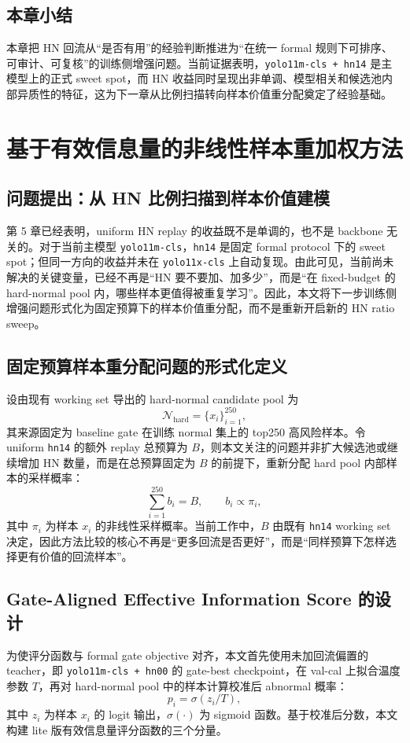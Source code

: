 \documentclass[UTF8,openany,12pt]{ctexbook}
\begin{document}
\section{本章小结}
本章把 HN 回流从“是否有用”的经验判断推进为“在统一 formal 规则下可排序、可审计、可复核”的训练侧增强问题。当前证据表明，\texttt{yolo11m-cls + hn14} 是主模型上的正式 sweet spot，而 HN 收益同时呈现出非单调、模型相关和候选池内部异质性的特征，这为下一章从比例扫描转向样本价值重分配奠定了经验基础。

\chapter{基于有效信息量的非线性样本重加权方法}

\section{问题提出：从 HN 比例扫描到样本价值建模}
第 5 章已经表明，uniform HN replay 的收益既不是单调的，也不是 backbone 无关的。对于当前主模型 \texttt{yolo11m-cls}，\texttt{hn14} 是固定 formal protocol 下的 sweet spot；但同一方向的收益并未在 \texttt{yolo11x-cls} 上自动复现。由此可见，当前尚未解决的关键变量，已经不再是“HN 要不要加、加多少”，而是“在 fixed-budget 的 hard-normal pool 内，哪些样本更值得被重复学习”。因此，本文将下一步训练侧增强问题形式化为固定预算下的样本价值重分配，而不是重新开启新的 HN ratio sweep。

\section{固定预算样本重分配问题的形式化定义}
设由现有 working set 导出的 hard-normal candidate pool 为
\begin{equation}
\mathcal{N}_{\mathrm{hard}} = \{x_i\}_{i=1}^{250},
\end{equation}
其来源固定为 baseline gate 在训练 normal 集上的 top250 高风险样本。令 uniform \texttt{hn14} 的额外 replay 总预算为 $B$，则本文关注的问题并非扩大候选池或继续增加 HN 数量，而是在总预算固定为 $B$ 的前提下，重新分配 hard pool 内部样本的采样概率：
\begin{equation}
\sum_{i=1}^{250} b_i = B,
\qquad
b_i \propto \pi_i,
\end{equation}
其中 $\pi_i$ 为样本 $x_i$ 的非线性采样概率。当前工作中，$B$ 由既有 \texttt{hn14} working set 决定，因此方法比较的核心不再是“更多回流是否更好”，而是“同样预算下怎样选择更有价值的回流样本”。

\section{Gate-Aligned Effective Information Score 的设计}
为使评分函数与 formal gate objective 对齐，本文首先使用未加回流偏置的 teacher，即 \texttt{yolo11m-cls + hn00} 的 gate-best checkpoint，在 val-cal 上拟合温度参数 $T$，再对 hard-normal pool 中的样本计算校准后 abnormal 概率：
\begin{equation}
p_i = \sigma(z_i / T),
\end{equation}
其中 $z_i$ 为样本 $x_i$ 的 logit 输出，$\sigma(\cdot)$ 为 sigmoid 函数。基于校准后分数，本文构建 lite 版有效信息量评分函数的三个分量。
\end{document}
